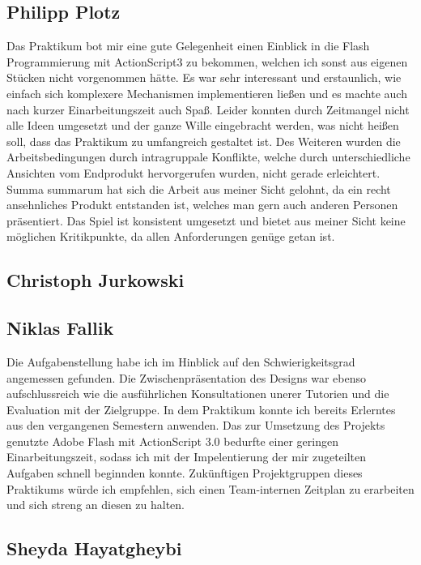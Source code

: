 \documentclass[a4paper, 11pt]{article} %
\begin{document}
\subsection{Philipp Plotz}
Das Praktikum bot mir eine gute Gelegenheit einen Einblick in die Flash Programmierung mit ActionScript3 zu bekommen, welchen ich sonst aus eigenen Stücken nicht vorgenommen hätte. Es war sehr interessant und erstaunlich, wie einfach sich komplexere Mechanismen implementieren ließen und es machte auch nach kurzer Einarbeitungszeit auch Spaß. Leider konnten durch Zeitmangel nicht alle Ideen umgesetzt und der ganze Wille eingebracht werden, was nicht heißen soll, dass das Praktikum zu umfangreich gestaltet ist. Des Weiteren wurden die Arbeitsbedingungen durch intragruppale Konflikte, welche durch unterschiedliche Ansichten vom Endprodukt hervorgerufen wurden, nicht gerade erleichtert. Summa summarum hat sich die Arbeit aus meiner Sicht gelohnt, da ein recht ansehnliches Produkt entstanden ist, welches man gern auch anderen Personen präsentiert. Das Spiel ist konsistent umgesetzt und bietet aus meiner Sicht keine möglichen Kritikpunkte, da allen Anforderungen genüge getan ist.
\subsection{Christoph Jurkowski}

\subsection{Niklas Fallik}
Die Aufgabenstellung habe ich im Hinblick auf den Schwierigkeitsgrad angemessen gefunden.
Die Zwischenpräsentation des Designs war ebenso aufschlussreich wie die ausführlichen Konsultationen unerer Tutorien und die Evaluation mit der Zielgruppe.
In dem Praktikum konnte ich bereits Erlerntes aus den vergangenen Semestern anwenden.
Das zur Umsetzung des Projekts genutzte Adobe Flash mit ActionScript 3.0 bedurfte einer geringen Einarbeitungszeit, sodass ich mit der Impelentierung der mir zugeteilten Aufgaben schnell beginnden konnte.
Zukünftigen Projektgruppen dieses Praktikums würde ich empfehlen, sich einen Team-internen Zeitplan zu erarbeiten und sich streng an diesen zu halten.

\subsection{Sheyda Hayatgheybi}

\end{document}
